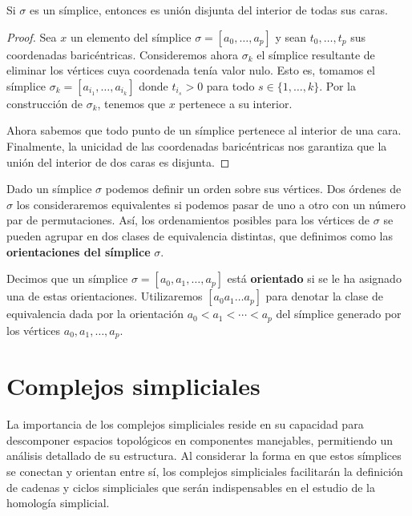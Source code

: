 \begin{proposicion}
	\label{prop:union-disjunta-simplices} Si $\sigma$ es un símplice, entonces es
	unión disjunta del interior de todas sus caras.
\end{proposicion}
\begin{proof}
	Sea $x$ un elemento del símplice $\sigma = [a_{0},\ldots,a_{p}]$ y sean $t_{0},
	\ldots ,t_{p}$ sus coordenadas baricéntricas. Consideremos ahora $\sigma_{k}$
	el símplice resultante de eliminar los vértices cuya coordenada tenía valor
	nulo. Esto es, tomamos el símplice $\sigma_{k}= [a_{i_1}, \ldots, a_{i_k}]$
	donde $t_{i_s}> 0$ para todo $s \in \{1, \ldots, k\}$. Por la construcción de $\sigma
	_{k}$, tenemos que $x$ pertenece a su interior.
	
	Ahora sabemos que todo punto de un símplice pertenece al interior de una cara.
	Finalmente, la unicidad de las coordenadas baricéntricas nos garantiza que la
	unión del interior de dos caras es disjunta.
\end{proof}

Dado un símplice $\sigma$ podemos definir un orden sobre sus vértices. Dos
órdenes de $\sigma$ los consideraremos equivalentes si podemos pasar de uno a
otro con un número par de permutaciones. Así, los ordenamientos posibles para
los vértices de $\sigma$ se pueden agrupar en dos clases de equivalencia
distintas, que definimos como las \textbf{orientaciones del símplice} $\sigma$.

\begin{definicion}
	Decimos que un símplice $\sigma = [a_{0}, a_{1}, \ldots, a_{p}]$ está \textbf{orientado}
	si se le ha asignado una de estas orientaciones. Utilizaremos $[a_{0}a_{1}\ldots
	a_{p}]$ para denotar la clase de equivalencia dada por la orientación $a_{0}< a
	_{1}< \cdots < a_{p}$ del símplice generado por los vértices $a_{0},a_{1},\ldots
	, a_{p}$.
\end{definicion}

\section{Complejos simpliciales}

La importancia de los complejos simpliciales reside en su capacidad para
descomponer espacios topológicos en componentes manejables, permitiendo un análisis
detallado de su estructura. Al considerar la forma en que estos símplices se
conectan y orientan entre sí, los complejos simpliciales facilitarán la definición
de cadenas y ciclos simpliciales que serán indispensables en el estudio de la homología
simplicial.

